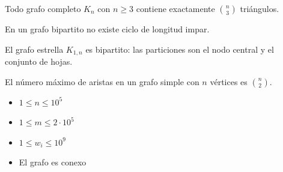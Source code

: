 \documentclass[12pt]{article}
\begin{document}
\begin{teorema}
Todo grafo completo $K_n$ con $n \geq 3$ contiene exactamente $\binom{n}{3}$ triángulos.
\end{teorema}

\begin{lema}
En un grafo bipartito no existe ciclo de longitud impar.
\end{lema}

\begin{ejemplo}
El grafo estrella $K_{1,n}$ es bipartito: las particiones son el nodo central y el conjunto de hojas.
\end{ejemplo}

\begin{restriccion}
El número máximo de aristas en un grafo simple con $n$ vértices es $\binom{n}{2}$.
\end{restriccion}

\begin{restriccionesPC}
\begin{itemize}
  \item $1 \leq n \leq 10^5$
  \item $1 \leq m \leq 2 \cdot 10^5$
  \item $1 \leq w_i \leq 10^9$
  \item El grafo es conexo
\end{itemize}
\end{restriccionesPC}

\lipsum[2]
\end{document}
